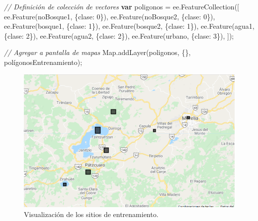 \documentclass[
  12pt,
  letterpaper,
  twoside]{book}
\newenvironment{Shaded}{\begin{snugshade}}{\end{snugshade}}
\newcommand{\BuiltInTok}[1]{#1}
\newcommand{\CommentTok}[1]{\textcolor[rgb]{0.24,0.58,0.00}{\textit{#1}}}
\newcommand{\DecValTok}[1]{\textcolor[rgb]{0.28,0.53,0.93}{#1}}
\newcommand{\FunctionTok}[1]{\textcolor[rgb]{0.48,0.12,0.64}{#1}}
\newcommand{\KeywordTok}[1]{\textcolor[rgb]{0.00,0.00,0.00}{\textbf{#1}}}
\newcommand{\NormalTok}[1]{#1}
\newcommand{\OperatorTok}[1]{\textcolor[rgb]{0.00,0.00,0.00}{#1}}
\newcommand{\StringTok}[1]{\textcolor[rgb]{0.87,0.29,0.22}{#1}}
\begin{document}
\begin{Shaded}
\begin{Highlighting}[]
\CommentTok{// Definición de colección de vectores}
\KeywordTok{var}\NormalTok{ poligonos }\OperatorTok{=}\NormalTok{ ee}\OperatorTok{.}\FunctionTok{FeatureCollection}\NormalTok{([}
\NormalTok{  ee}\OperatorTok{.}\FunctionTok{Feature}\NormalTok{(noBosque1}\OperatorTok{,}\NormalTok{ \{}\StringTok{\textquotesingle{}clase\textquotesingle{}}\OperatorTok{:} \DecValTok{0}\NormalTok{\})}\OperatorTok{,}
\NormalTok{  ee}\OperatorTok{.}\FunctionTok{Feature}\NormalTok{(noBosque2}\OperatorTok{,}\NormalTok{ \{}\StringTok{\textquotesingle{}clase\textquotesingle{}}\OperatorTok{:} \DecValTok{0}\NormalTok{\})}\OperatorTok{,}
\NormalTok{  ee}\OperatorTok{.}\FunctionTok{Feature}\NormalTok{(bosque1}\OperatorTok{,}\NormalTok{ \{}\StringTok{\textquotesingle{}clase\textquotesingle{}}\OperatorTok{:} \DecValTok{1}\NormalTok{\})}\OperatorTok{,}
\NormalTok{  ee}\OperatorTok{.}\FunctionTok{Feature}\NormalTok{(bosque2}\OperatorTok{,}\NormalTok{ \{}\StringTok{\textquotesingle{}clase\textquotesingle{}}\OperatorTok{:} \DecValTok{1}\NormalTok{\})}\OperatorTok{,}
\NormalTok{  ee}\OperatorTok{.}\FunctionTok{Feature}\NormalTok{(agua1}\OperatorTok{,}\NormalTok{ \{}\StringTok{\textquotesingle{}clase\textquotesingle{}}\OperatorTok{:} \DecValTok{2}\NormalTok{\})}\OperatorTok{,}
\NormalTok{  ee}\OperatorTok{.}\FunctionTok{Feature}\NormalTok{(agua2}\OperatorTok{,}\NormalTok{ \{}\StringTok{\textquotesingle{}clase\textquotesingle{}}\OperatorTok{:} \DecValTok{2}\NormalTok{\})}\OperatorTok{,}
\NormalTok{  ee}\OperatorTok{.}\FunctionTok{Feature}\NormalTok{(urbano}\OperatorTok{,}\NormalTok{ \{}\StringTok{\textquotesingle{}clase\textquotesingle{}}\OperatorTok{:} \DecValTok{3}\NormalTok{\})}\OperatorTok{,}
\NormalTok{])}\OperatorTok{;}

\CommentTok{// Agregar a pantalla de mapas}
\BuiltInTok{Map}\OperatorTok{.}\FunctionTok{addLayer}\NormalTok{(poligonos}\OperatorTok{,}\NormalTok{ \{\}}\OperatorTok{,} \StringTok{\textquotesingle{}polígonosEntrenamiento\textquotesingle{}}\NormalTok{)}\OperatorTok{;}
\end{Highlighting}
\end{Shaded}

\begin{figure}[H]

{\centering \includegraphics[width=0.8\linewidth]{Img/polyTrain} 

}

\caption{Visualización de los sitios de entrenamiento.}\label{fig:fc121}
\end{figure}
\end{document}
